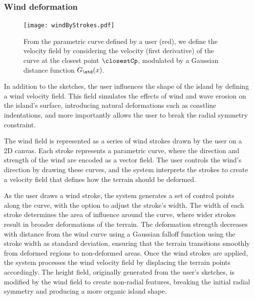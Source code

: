 \subsubsection{Wind deformation}
\label{sec:coral-island-wind-deformation}

\begin{figure}[H]
\centering
\texttt{[image: windByStrokes.pdf]}
\caption{From the parametric curve defined by a user (red), we define the velocity field by considering the velocity (first derivative) of the curve at the closest point $\closestCp$, modulated by a Gaussian distance function $G_{\std}(x)$.}
\label{fig:coral-island-wind-from-strokes}
\end{figure}

In addition to the sketches, the user influences the shape of the island by defining a wind velocity field. This field simulates the effects of wind and wave erosion on the island's surface, introducing natural deformations such as coastline indentations, and more importantly allows the user to break the radial symmetry constraint.

The wind field is represented as a series of wind strokes drawn by the user on a 2D canvas. Each stroke represents a parametric curve, where the direction and strength of the wind are encoded as a vector field. The user controls the wind's direction by drawing these curves, and the system interprets the strokes to create a velocity field that defines how the terrain should be deformed.

As the user draws a wind stroke, the system generates a set of control points along the curve, with the option to adjust the stroke's width. The width of each stroke determines the area of influence around the curve, where wider strokes result in broader deformations of the terrain.
The deformation strength decreases with distance from the wind curve using a Gaussian falloff function using the stroke width as standard deviation, ensuring that the terrain transitions smoothly from deformed regions to non-deformed areas.
Once the wind strokes are applied, the system processes the wind velocity field by displacing the terrain points accordingly. The height field, originally generated from the user's sketches, is modified by the wind field to create non-radial features, breaking the initial radial symmetry and producing a more organic island shape.








